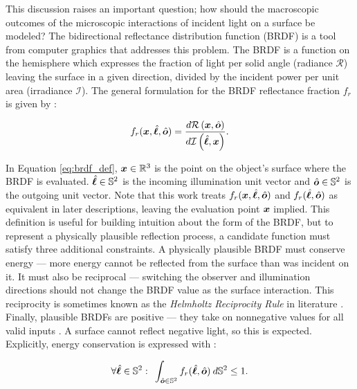 This discussion raises an important question; how should the macroscopic outcomes of the microscopic interactions of incident light on a surface be modeled? The bidirectional reflectance distribution function (BRDF) is a tool from computer graphics that addresses this problem. The BRDF is a function on the hemisphere which expresses the fraction of light per solid angle (radiance $\mathcal{R}$) leaving the surface in a given direction, divided by the incident power per unit area (irradiance $\mathcal{I}$). The general formulation for the BRDF reflectance fraction $f_r$ is given by \cite{duvenhage2013}:

\begin{equation} \label{eq:brdf_def}
    f_r(\bm{x}, \hat{\bm{\ell}}, \hat{\bm{o}}) = \frac{d\mathcal{R}\left(\bm{x}, \hat{\bm{o}}\right)}{d\mathcal{I}\left(\hat{\bm{\ell}}, \bm{x}\right)}.
\end{equation}

In Equation \ref{eq:brdf_def}, $\bm{x} \in \mathbb{R}^3$ is the point on the object's surface where the BRDF is evaluated. $\hat{\bm{\ell}} \in \mathbb{S}^2$ is the incoming illumination unit vector and $\hat{\bm{o}} \in \mathbb{S}^2$ is the outgoing unit vector. Note that this work treats $f_r(\bm{x}, \hat{\bm{\ell}}, \hat{\bm{o}})$ and $f_r(\hat{\bm{\ell}}, \hat{\bm{o}})$ as equivalent in later descriptions, leaving the evaluation point $\bm{x}$ implied. This definition is useful for building intuition about the form of the BRDF, but to represent a physically plausible reflection process, a candidate function must satisfy three additional constraints. A physically plausible BRDF must conserve energy --- more energy cannot be reflected from the surface than was incident on it. It must also be reciprocal --- switching the observer and illumination directions should not change the BRDF value as the surface interaction. This reciprocity is sometimes known as the \textit{Helmholtz Reciprocity Rule} in literature \cite{montes2012}. Finally, plausible BRDFs are positive --- they take on nonnegative values for all valid inputs \cite{montes2012}. A surface cannot reflect negative light, so this is expected. Explicitly, energy conservation is expressed with \cite{montes2012}:

\begin{equation} \label{eq:brdf_energy_cons}
  \forall \hat{\bm{\ell}} \in \mathbb{S}^2 : \:\: \int_{\hat{\bm{o}} \in \mathbb{S}^2} f_r(\hat{\bm{\ell}}, \hat{\bm{o}}) \: d\mathbb{S}^2 \leq 1.
\end{equation}

